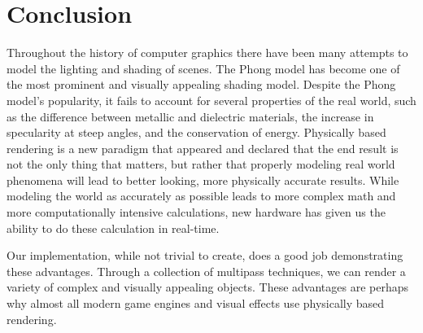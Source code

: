 \documentclass[12pt, letterpaper, twocolumn]{article}
\begin{document}
\section{Conclusion}

Throughout the history of computer graphics there have been many attempts to
model the lighting and shading of scenes. The Phong model has become one of
the most prominent and visually appealing shading model. Despite the Phong
model’s popularity, it fails to account for several properties of the real
world, such as the difference between metallic and dielectric materials, the
increase in specularity at steep angles, and the conservation of energy.
Physically based rendering is a new paradigm that appeared and declared that
the end result is not the only thing that matters, but rather that properly
modeling real world phenomena will lead to better looking, more physically
accurate results. While modeling the world as accurately as possible leads to
more complex math and more computationally intensive calculations, new
hardware has given us the ability to do these calculation in real-time.

Our implementation, while not trivial to create, does a good job demonstrating
these advantages. Through a collection of multipass techniques, we can render
a variety of complex and visually appealing objects. These advantages are
perhaps why almost all modern game engines and visual effects use physically
based rendering.

\printbibliography
\end{document}
